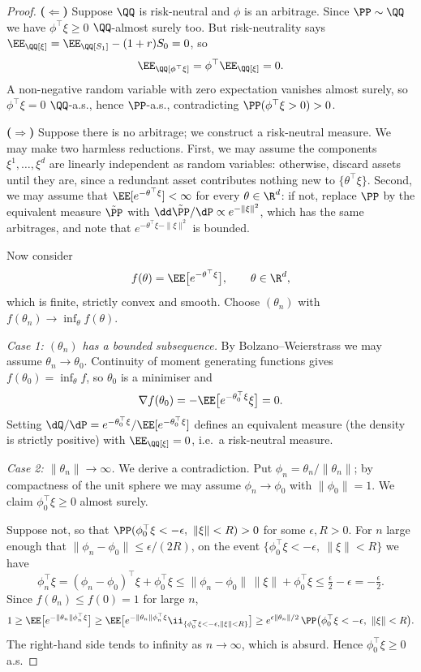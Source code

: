 \begin{proof}
	\textbf{($\Leftarrow$)} Suppose $\QQ$ is risk-neutral and $\phi$ is an arbitrage. Since $\PP \sim \QQ$ we have $\phi^\top \xi \geq 0$ $\QQ$-almost surely too. But risk-neutrality says $\EE_\QQ[\xi] = \EE_\QQ[S_1] - (1+r)S_0 = 0$, so
	$$
	\EE_\QQ[\phi^\top \xi] = \phi^\top \EE_\QQ[\xi] = 0.
	$$
	A non-negative random variable with zero expectation vanishes almost surely, so $\phi^\top\xi = 0$ $\QQ$-a.s., hence $\PP$-a.s., contradicting $\PP(\phi^\top\xi > 0) > 0$.

	\textbf{($\Rightarrow$)} Suppose there is no arbitrage; we construct a risk-neutral measure. We may make two harmless reductions. First, we may assume the components $\xi^1,\dots,\xi^d$ are linearly independent as random variables: otherwise, discard assets until they are, since a redundant asset contributes nothing new to $\{\theta^\top \xi\}$. Second, we may assume that $\EE[e^{-\theta^\top \xi}] < \infty$ for every $\theta \in \R^d$: if not, replace $\PP$ by the equivalent measure $\tilde\PP$ with $\dd\tilde\PP/\dP \propto e^{-\|\xi\|^2}$, which has the same arbitrages, and note that $e^{-\theta^\top\xi - \|\xi\|^2}$ is bounded.

	Now consider
	$$
	f(\theta) = \EE\big[e^{-\theta^\top \xi}\big], \qquad \theta \in \R^d,
	$$
	which is finite, strictly convex and smooth. Choose $(\theta_n)$ with $f(\theta_n) \to \inf_\theta f(\theta)$.

	\emph{Case 1: $(\theta_n)$ has a bounded subsequence.} By Bolzano--Weierstrass we may assume $\theta_n \to \theta_0$. Continuity of moment generating functions gives $f(\theta_0) = \inf_\theta f$, so $\theta_0$ is a minimiser and
	$$
	\nabla f(\theta_0) = -\EE\big[e^{-\theta_0^\top \xi}\xi\big] = 0.
	$$
	Setting $\dQ/\dP = e^{-\theta_0^\top\xi}/\EE[e^{-\theta_0^\top \xi}]$ defines an equivalent measure (the density is strictly positive) with $\EE_\QQ[\xi] = 0$, i.e.\ a risk-neutral measure.

	\emph{Case 2: $\|\theta_n\| \to \infty$.} We derive a contradiction. Put $\phi_n = \theta_n/\|\theta_n\|$; by compactness of the unit sphere we may assume $\phi_n \to \phi_0$ with $\|\phi_0\| = 1$. We claim $\phi_0^\top \xi \geq 0$ almost surely.

	Suppose not, so that $\PP(\phi_0^\top \xi < -\epsilon,\ \|\xi\| < R) > 0$ for some $\epsilon, R > 0$. For $n$ large enough that $\|\phi_n - \phi_0\| \leq \epsilon/(2R)$, on the event $\{\phi_0^\top\xi < -\epsilon,\ \|\xi\| < R\}$ we have
	$$
	\phi_n^\top \xi = (\phi_n - \phi_0)^\top \xi + \phi_0^\top \xi \leq \|\phi_n - \phi_0\|\,\|\xi\| + \phi_0^\top \xi \leq \tfrac{\epsilon}{2} - \epsilon = -\tfrac{\epsilon}{2}.
	$$
	Since $f(\theta_n) \le f(0) = 1$ for large $n$,
	$$
	1 \geq \EE\big[e^{-\|\theta_n\|\phi_n^\top \xi}\big] \geq \EE\big[e^{-\|\theta_n\|\phi_n^\top\xi}\ii_{\{\phi_0^\top\xi<-\epsilon,\|\xi\|<R\}}\big] \geq e^{\epsilon\|\theta_n\|/2}\,\PP\big(\phi_0^\top \xi < -\epsilon,\ \|\xi\| < R\big).
	$$
	The right-hand side tends to infinity as $n \to \infty$, which is absurd. Hence $\phi_0^\top \xi \geq 0$ a.s.


\end{proof}

